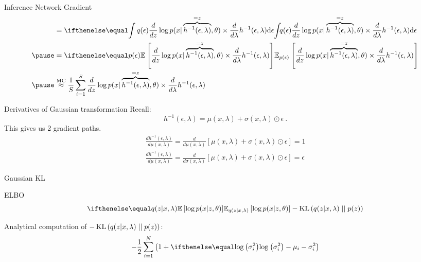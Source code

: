 \documentclass[14pt]{beamer}
\begin{document}
\begin{frame}{Inference Network Gradient}
\begin{equation*}
\begin{aligned}
&= \intl{q(\epsilon) \frac{d}{dz} \log p(x| \overbrace{h^{-1}(\epsilon, \lambda)}^{=z}, \theta) \times \frac{d}{d\lambda} h^{-1}(\epsilon, \lambda)}{\epsilon}  \\ \pause
&= \E[p(\epsilon)]{\frac{d}{dz} \log p(x| \overbrace{h^{-1}(\epsilon, \lambda)}^{=z}, \theta)\times \frac{d}{d\lambda} h^{-1}(\epsilon, \lambda)}\\ \pause
&\overset{\text{MC}}{\approx} \frac{1}{S}\sum_{i=1}^{S} \frac{d}{dz} \log p(x| \overbrace{h^{-1}(\epsilon, \lambda)}^{=z}, \theta) \times \frac{d}{d\lambda} h^{-1}(\epsilon, \lambda)
\end{aligned}
\end{equation*}
\end{frame}

\begin{frame}{Derivatives of Gaussian transformation}
Recall:
$$ h^{-1}(\epsilon, \lambda) = \mu(x,\lambda) + \sigma(x,\lambda) \odot \epsilon \ . $$
\pause
This gives us 2 gradient paths.
\pause
\begin{align*}
\frac{d h^{-1}(\epsilon, \lambda)}{d\mu(x,\lambda)} = \frac{d}{d\mu(x,\lambda)}\left[ \mu(x,\lambda) + \sigma(x,\lambda) \odot \epsilon \right] = 1 \\
\frac{d h^{-1}(\epsilon, \lambda)}{d\mu(x,\lambda)} = \frac{d}{d\sigma(x,\lambda)}\left[ \mu(x,\lambda) + \sigma(x,\lambda) \odot \epsilon \right] = \epsilon
\end{align*}
\end{frame}

\begin{frame}{Gaussian KL}
\begin{block}{ELBO}
\begin{equation*}
\E[q(z|x,\lambda)]{\log p(x|z,\theta)} - \KL{q(z|x,\lambda)}{p(z)}
\end{equation*}
\end{block}
\pause
Analytical computation of $ -\operatorname{KL}\left(q(z|x,\lambda)\mid\mid p(z)\right) $:
\begin{equation*}
-\frac{1}{2}\sum_{i=1}^{N}\left(1 + \loga{\sigma^{2}_{i}} - 
\mu_i - \sigma^{2}_{i} \right)
\end{equation*}
\end{frame}
\end{document}
